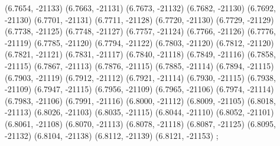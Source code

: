 {(6.7654,	-21133)
(6.7663,	-21131)
(6.7673,	-21132)
(6.7682,	-21130)
(6.7692,	-21130)
(6.7701,	-21131)
(6.7711,	-21128)
(6.7720,	-21130)
(6.7729,	-21129)
(6.7738,	-21125)
(6.7748,	-21127)
(6.7757,	-21124)
(6.7766,	-21126)
(6.7776,	-21119)
(6.7785,	-21120)
(6.7794,	-21122)
(6.7803,	-21120)
(6.7812,	-21120)
(6.7821,	-21121)
(6.7831,	-21117)
(6.7840,	-21118)
(6.7849,	-21116)
(6.7858,	-21115)
(6.7867,	-21113)
(6.7876,	-21115)
(6.7885,	-21114)
(6.7894,	-21115)
(6.7903,	-21119)
(6.7912,	-21112)
(6.7921,	-21114)
(6.7930,	-21115)
(6.7938,	-21109)
(6.7947,	-21115)
(6.7956,	-21109)
(6.7965,	-21106)
(6.7974,	-21114)
(6.7983,	-21106)
(6.7991,	-21116)
(6.8000,	-21112)
(6.8009,	-21105)
(6.8018,	-21113)
(6.8026,	-21103)
(6.8035,	-21115)
(6.8044,	-21110)
(6.8052,	-21101)
(6.8061,	-21108)
(6.8070,	-21113)
(6.8078,	-21118)
(6.8087,	-21125)
(6.8095,	-21132)
(6.8104,	-21138)
(6.8112,	-21139)
(6.8121,	-21153)
    };
